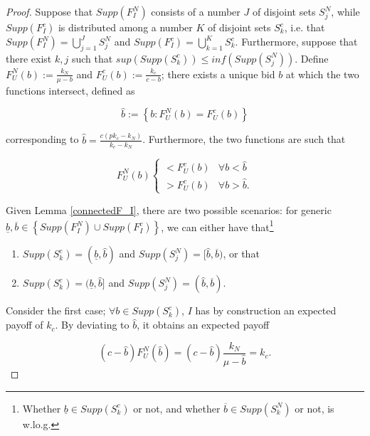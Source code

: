 \documentclass[11pt]{article}
\theoremstyle{plain}
\theoremstyle{definition}
\theoremstyle{plain}
\theoremstyle{plain}
\theoremstyle{plain}
\theoremstyle{plain}
\numberwithin{equation}{section}
\begin{document}
\begin{proof}
    Suppose that $Supp(F_I^N)$ consists of a number $J$ of disjoint sets $S_{j}^N$, while $Supp(F_I^c)$ is distributed among a number $K$ of disjoint sets $S_{k}^c$, i.e. that $Supp(F_I^N) = \bigcup^{J}_{j=1} S_{j}^N$ and $Supp(F_I^c) = \bigcup^K_{k=1} S_{k}^c$. Furthermore, suppose that there exist $k, j$ such that $sup(Supp(S_{k}^c))\leq inf(Supp(S_{j}^N))$. Define $F_U^N (b) := \frac{k_N}{\mu-b}$ and $F_U^c(b) := \frac{k_c}{c-b}$; there exists a unique bid $b$ at which the two functions intersect, defined as

    \begin{equation*}
        \hat{b} := \left\{b: F_U^N (b) = F_U^c (b) \right\}
    \end{equation*}
    \vspace{-0.2mm}

    \noindent corresponding to $\hat{b} = \frac{c\left(p k_c-k_N\right)}{k_c-k_N}$. Furthermore, the two functions are such that

    \begin{equation*}
        F_U^N(b) \begin{cases}
            < F_U^c(b) & \forall b < \hat{b} \\
            > F_U^c(b) & \forall b > \hat{b}.
        \end{cases}
    \end{equation*}
    \vspace{-0.2mm}

    \noindent Given Lemma \ref{connectedF_I}, there are two possible scenarios: for generic $\underline{b}, \overline{b} \in \left\{ Supp\left( F_I^N \right) \cup Supp\left( F_I^c \right)\right\}$, we can either have that\footnote{Whether $\underline{b} \in Supp(S_{k}^c)$ or not, and whether $\overline{b} \in Supp(S_{k}^N)$ or not, is w.lo.g.}
    \begin{enumerate}
        \item $Supp(S_{k}^c) = (\underline{b}, \hat{b})$ and $Supp(S_{j}^N) = [\hat{b}, \overline{b})$, or that
        \item $Supp(S_{k}^c) = (\underline{b}, \hat{b}]$ and $Supp(S_{j}^N) = (\hat{b}, \overline{b})$.
    \end{enumerate}
    Consider the first case; $\forall b \in Supp(S_{k}^c)$, $I$ has by construction an expected payoff of $k_c$. By deviating to $\hat{b}$, it obtains an expected payoff 

    \begin{equation*}
        (c-\hat{b})F_U^N(\hat{b}) = (c-\hat{b}) \frac{k_N}{\mu- \hat{b}} = k_c.
    \end{equation*}
    \vspace{-0.2mm}


\end{proof}
\end{document}
